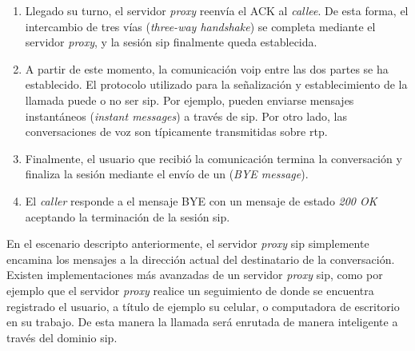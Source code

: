 \documentclass[a4paper,12pt]{report}
\begin{document}
\begin{enumerate}
\item Llegado su turno, el servidor \emph{proxy} reenvía el ACK al \emph{callee}. De
esta forma, el intercambio de tres vías (\emph{three-way handshake}) se
completa mediante el servidor \emph{proxy}, y la sesión \ac{sip} finalmente queda
establecida.

\item A partir de este momento, la comunicación \ac{voip} entre las dos partes se ha
establecido. El protocolo utilizado para la señalización y establecimiento de
la llamada puede o no ser \ac{sip}. Por ejemplo, pueden enviarse mensajes
instantáneos (\emph{instant messages}) a través de \ac{sip}. Por otro lado, las
conversaciones de voz son típicamente transmitidas sobre \ac{rtp}.  

\item Finalmente, el usuario que recibió la comunicación termina la conversación y
finaliza la sesión mediante el envío de un (\emph{BYE message}). 

\item El \emph{caller} responde a el mensaje BYE con un mensaje de estado
\emph{200 OK} aceptando la terminación de la sesión \ac{sip}.

\end{enumerate}


En el escenario descripto anteriormente, el servidor \emph{proxy} \ac{sip} simplemente
encamina los mensajes a la dirección actual del destinatario de la
conversación. Existen implementaciones más avanzadas de un servidor \emph{proxy} \ac{sip},
como por ejemplo que el servidor \emph{proxy} realice un seguimiento de donde se
encuentra registrado el usuario, a título de ejemplo su celular, o computadora de
escritorio en su trabajo. De esta manera la llamada será enrutada de manera
inteligente a través del dominio \ac{sip}.
\end{document}
